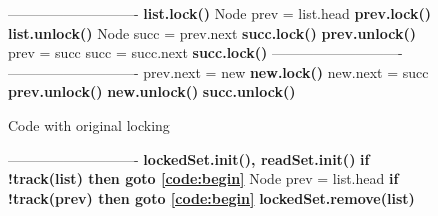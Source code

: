 \newcommand{\spOne}{\hspace{-3mm}\ }
\newcommand{\spZero}{\hspace{-3mm}}
\begin{figure*}
\codesize
	\begin{center}
	\begin{subfigure}[b]{.45\textwidth}
		\begin{algorithmic}[1]{}
		{\ttfamily
			 \label{code:begin}
			\Statex ----------------------------
			\State                               \label{code:beginRead}
            \State{\spOne}\textbf{list.lock()}
			\State{\spOne}Node prev = list.head
			\State{\spOne}\textbf{prev.lock()}
            \State{\spOne}\textbf{list.unlock()}
			\State{\spOne}Node succ = prev.next
			\State{\spOne}\textbf{succ.lock()}
			\State{\spOne}\textbf{prev.unlock()}
			\State{\spZero}prev = succ
			\State{\spZero}succ = succ.next
			\State{\spZero}\textbf{succ.lock()}  \label{code:endRead}
			\Statex ----------------------------
			\State                               \label{code:beginValidation}
			\State
			\State
			\State
			\State
			\State
            \State                               \label{code:endValidation}
			\Statex ----------------------------
			\State{\spZero}prev.next = new       \label{code:beginUpdate}
			\State{\spZero}\textbf{new.lock()}
			\State{\spZero}new.next = succ
            \State
			\State{\spZero}\textbf{prev.unlock()}
            \State
			\State{\spZero}\textbf{new.unlock()}
            \State
			\State{\spZero}\textbf{succ.unlock()}  \label{code:endUpdate}
			\EndFunction
			}
		\end{algorithmic}
		\caption{Code with original locking} \label{figure:transformation:before}
	\end{subfigure}
	\begin{subfigure}[b]{.45\textwidth}
		\begin{algorithmic}[1]{}
		{\ttfamily
			 \label{code:begin}
			\Statex ----------------------------
			\Comment{\textrm{read-only phase}}
            \State{\spOne}\textbf{lockedSet.init(), readSet.init()} \label{code:initSets}
            \State{\spOne}\textbf{if !track(list)  then {goto} \ref{code:begin}} \label{code:readGhaseGoto0}
			\State{\spOne}Node prev = list.head
			\State{\spOne}\textbf{if !track(prev)  then {goto} \ref{code:begin}} \label{code:readGhaseGoto1}
            \State{\spOne}\textbf{lockedSet.remove(list)} \label{code:lockedSet:remove1}
}
\end{algorithmic}
\end{subfigure}
\end{center}
\end{figure*}
